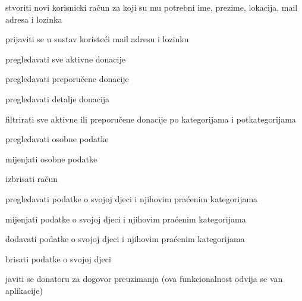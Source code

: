 			
			\begin{packed_enum}
				\item  {}
				
				\begin{packed_enum}
					
					\item stvoriti novi korisnicki račun za koji su mu potrebni ime, prezime, lokacija, mail adresa i lozinka
					
				\end{packed_enum}

				\item  {}
				
				\begin{packed_enum}
					
					\item prijaviti se u sustav koristeći mail adresu i lozinku
					
				\end{packed_enum}
			
				\item  {}
				
				\begin{packed_enum}
					
					\item pregledavati sve aktivne donacije
					\item pregledavati preporučene donacije
					\item pregledavati detalje donacija
					\item filtrirati sve aktivne ili preporučene donacije po kategorijama i potkategorijama
					\item pregledavati osobne podatke
					\item mijenjati osobne podatke
					\item izbrisati račun
					\item pregledavati podatke o svojoj djeci i njihovim praćenim kategorijama
					\eject
					\item mijenjati podatke o svojoj djeci i njihovim praćenim kategorijama
					\item dodavati podatke o svojoj djeci i njihovim praćenim kategorijama
					\item brisati podatke o svojoj djeci
					\item javiti se donatoru za dogovor preuzimanja (ova funkcionalnost odvija se van aplikacije)		
					

\end{packed_enum}
\end{packed_enum}

